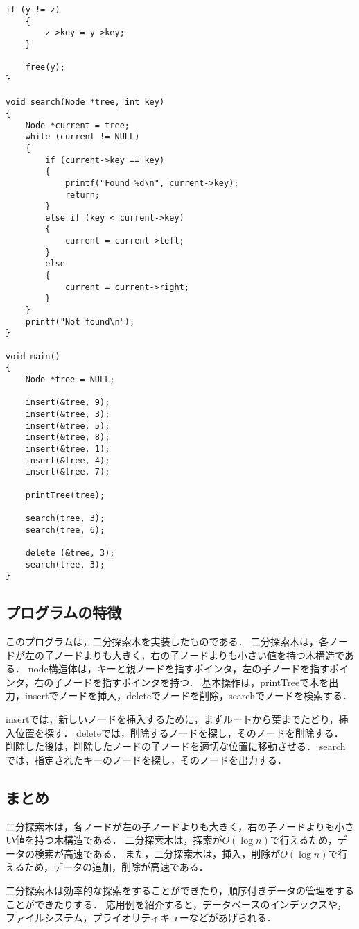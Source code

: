 \documentclass{ltjsarticle}
\begin{document}
\begin{lstlisting}[frame=single, lineskip=-5pt]
    if (y != z)
    {
        z->key = y->key;
    }

    free(y);
}

void search(Node *tree, int key)
{
    Node *current = tree;
    while (current != NULL)
    {
        if (current->key == key)
        {
            printf("Found %d\n", current->key);
            return;
        }
        else if (key < current->key)
        {
            current = current->left;
        }
        else
        {
            current = current->right;
        }
    }
    printf("Not found\n");
}

void main()
{
    Node *tree = NULL;

    insert(&tree, 9);
    insert(&tree, 3);
    insert(&tree, 5);
    insert(&tree, 8);
    insert(&tree, 1);
    insert(&tree, 4);
    insert(&tree, 7);

    printTree(tree);

    search(tree, 3);
    search(tree, 6);

    delete (&tree, 3);
    search(tree, 3);
}
\end{lstlisting}

\subsection{プログラムの特徴}
このプログラムは，二分探索木を実装したものである．
二分探索木は，各ノードが左の子ノードよりも大きく，右の子ノードよりも小さい値を持つ木構造である．
node構造体は，キーと親ノードを指すポインタ，左の子ノードを指すポインタ，右の子ノードを指すポインタを持つ．
基本操作は，printTreeで木を出力，insertでノードを挿入，deleteでノードを削除，searchでノードを検索する．

insertでは，新しいノードを挿入するために，まずルートから葉までたどり，挿入位置を探す．
deleteでは，削除するノードを探し，そのノードを削除する．
削除した後は，削除したノードの子ノードを適切な位置に移動させる．
searchでは，指定されたキーのノードを探し，そのノードを出力する．

\subsection{まとめ}
二分探索木は，各ノードが左の子ノードよりも大きく，右の子ノードよりも小さい値を持つ木構造である．
二分探索木は，探索が$O(\log n)$で行えるため，データの検索が高速である．
また，二分探索木は，挿入，削除が$O(\log n)$で行えるため，データの追加，削除が高速である．

二分探索木は効率的な探索をすることができたり，順序付きデータの管理をすることができたりする．
応用例を紹介すると，データベースのインデックスや，ファイルシステム，プライオリティキューなどがあげられる．
\end{document}
